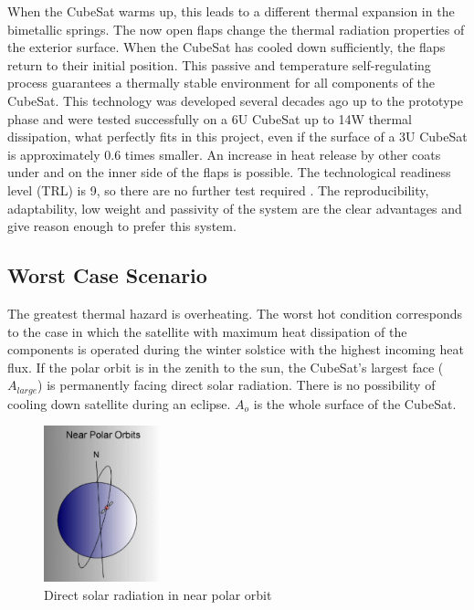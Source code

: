 When the CubeSat warms up, this leads to a different thermal expansion in the bimetallic
springs. The now open flaps change the thermal radiation properties of the exterior
surface. When the CubeSat has cooled down sufficiently, the flaps return to their
initial position. This passive and temperature self-regulating process guarantees
a thermally stable environment for all components of the CubeSat. This technology
was developed several decades ago up to the prototype phase and were tested
successfully on a 6U CubeSat up to 14W thermal dissipation, what perfectly fits
in this project, even if the surface of a 3U CubeSat is approximately 0.6 times
smaller. An increase in heat release by other coats under and on the inner side
of the flaps is possible. The technological readiness level (TRL) is 9, so there
are no further test required \cite{NASA_thermal}.
The reproducibility, adaptability, low weight and passivity of the system are
the clear advantages and give reason enough to prefer this system. \cite{Thermal_NASA_patent}

\subsection{Worst Case Scenario}

The greatest thermal hazard is overheating. The worst hot condition corresponds
to the case in which the satellite with maximum heat dissipation of the components
is operated during the winter solstice with the highest incoming heat flux.
If the polar orbit is in the zenith to the sun, the CubeSat’s largest face
($A_{large}$) is permanently facing direct solar radiation. There is no possibility
of cooling down satellite during an eclipse. $A_o$ is the whole surface of the CubeSat.


\begin{figure}[h]
	\centering
	\includegraphics[width=0.3\textwidth]{img/near_polar_orbit.png}
	\caption{Direct solar radiation in near polar orbit}
	\label{fig:near_polar_orbit}
\end{figure}


